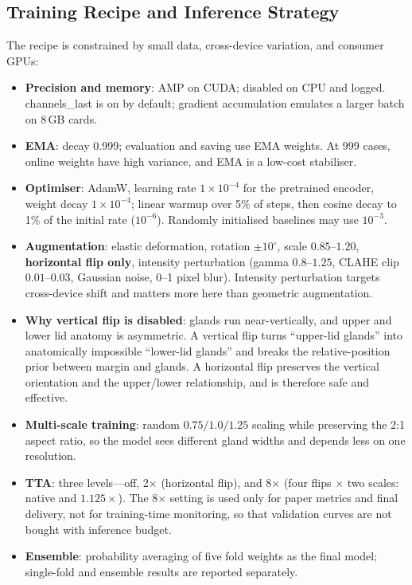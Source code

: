 

\subsection{Training Recipe and Inference Strategy}\label{sec:recipe}

The recipe is constrained by small data, cross-device variation, and consumer GPUs:

\begin{itemize}
\item \textbf{Precision and memory}: AMP on CUDA; disabled on CPU and logged. channels\_last is on by default; gradient accumulation emulates a larger batch on 8\,GB cards.
\item \textbf{EMA}: decay 0.999; evaluation and saving use EMA weights. At 999 cases, online weights have high variance, and EMA is a low-cost stabiliser.
\item \textbf{Optimiser}: AdamW, learning rate $1\times10^{-4}$ for the pretrained encoder, weight decay $1\times10^{-4}$; linear warmup over 5\% of steps, then cosine decay to 1\% of the initial rate ($10^{-6}$). Randomly initialised baselines may use $10^{-3}$.
\item \textbf{Augmentation}: elastic deformation, rotation $\pm10^\circ$, scale $0.85$--$1.20$, \textbf{horizontal flip only}, intensity perturbation (gamma $0.8$--$1.25$, CLAHE clip $0.01$--$0.03$, Gaussian noise, 0--1 pixel blur). Intensity perturbation targets cross-device shift and matters more here than geometric augmentation.
\item \textbf{Why vertical flip is disabled}: glands run near-vertically, and upper and lower lid anatomy is asymmetric. A vertical flip turns ``upper-lid glands'' into anatomically impossible ``lower-lid glands'' and breaks the relative-position prior between margin and glands. A horizontal flip preserves the vertical orientation and the upper/lower relationship, and is therefore safe and effective.
\item \textbf{Multi-scale training}: random $0.75/1.0/1.25$ scaling while preserving the 2:1 aspect ratio, so the model sees different gland widths and depends less on one resolution.
\item \textbf{TTA}: three levels---off, 2$\times$ (horizontal flip), and 8$\times$ (four flips $\times$ two scales: native and $1.125\times$). The 8$\times$ setting is used only for paper metrics and final delivery, not for training-time monitoring, so that validation curves are not bought with inference budget.
\item \textbf{Ensemble}: probability averaging of five fold weights as the final model; single-fold and ensemble results are reported separately.
\end{itemize}

